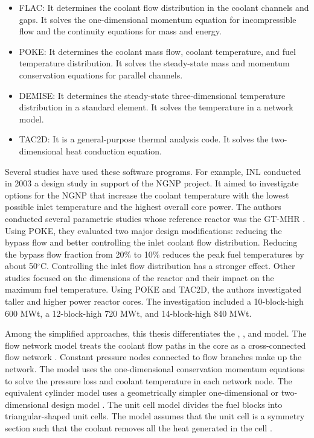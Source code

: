\begin{itemize}
\item FLAC: It determines the coolant flow distribution in the coolant channels and gaps.
It solves the one-dimensional momentum equation for incompressible flow and the continuity equations for mass and energy.

\item POKE: It determines the coolant mass flow, coolant temperature, and fuel temperature distribution.
It solves the steady-state mass and momentum conservation equations for parallel channels.

\item DEMISE: It determines the steady-state three-dimensional temperature distribution in a standard element.
It solves the temperature in a network model.

\item TAC2D: It is a general-purpose thermal analysis code.
It solves the two-dimensional heat conduction equation.
\end{itemize}

Several studies have used these software programs.
For example, \gls{INL} conducted in 2003 a design study \cite{macdonald_ngnp_2003} in support of the \gls{NGNP} project.
It aimed to investigate options for the NGNP that increase the coolant temperature with the lowest possible inlet temperature and the highest overall core power.
The authors conducted several parametric studies whose reference reactor was the GT-MHR \cite{general_atomics_gas_1996}.
Using POKE, they evaluated two major design modifications: reducing the bypass flow and better controlling the inlet coolant flow distribution.
Reducing the bypass flow fraction from 20$\%$ to 10$\%$ reduces the peak fuel temperatures by about 50$^{\circ}$C.
Controlling the inlet flow distribution has a stronger effect.
Other studies focused on the dimensions of the reactor and their impact on the maximum fuel temperature.
Using POKE and TAC2D, the authors investigated taller and higher power reactor cores.
The investigation included a 10-block-high 600 MWt, a 12-block-high 720 MWt, and 14-block-high 840 MWt.

Among the simplified approaches, this thesis differentiates the , , and  model.
The flow network model treats the coolant flow paths in the core as a cross-connected flow network \cite{shenoy_htgr_1974}.
Constant pressure nodes connected to flow branches make up the network.
The model uses the one-dimensional conservation momentum equations to solve the pressure loss and coolant temperature in each network node.
The equivalent cylinder model uses a geometrically simpler one-dimensional or two-dimensional design model \cite{shenoy_htgr_1974}\cite{tak_numerical_2008}.
The unit cell model divides the fuel blocks into triangular-shaped unit cells.
The model assumes that the unit cell is a symmetry section such that the coolant removes all the heat generated in the cell \cite{tak_numerical_2008}.

